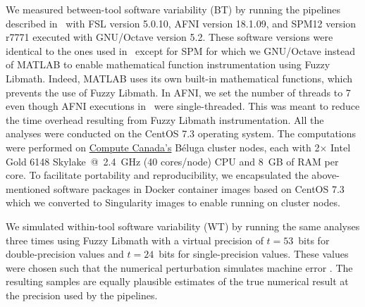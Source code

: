\documentclass[11pt,onecolumn]{article}
\begin{document}
We measured between-tool software variability (BT) by running the pipelines
described in~\cite{bowring2019exploring} with FSL version 5.0.10, AFNI
version 18.1.09, and SPM12 version r7771 executed with GNU/Octave version
5.2. These software versions were identical to the ones used 
in~\cite{bowring2019exploring} except for SPM for which we  GNU/Octave
instead of MATLAB to enable mathematical function instrumentation using
Fuzzy Libmath. Indeed, MATLAB uses its own built-in mathematical functions,
which prevents the use of Fuzzy Libmath. In AFNI, we set the number of
threads to 7 even though AFNI executions
in~\cite{bowring2019exploring} were single-threaded. This was meant to
reduce the time overhead resulting from Fuzzy Libmath instrumentation.
All the analyses were conducted on the CentOS 7.3 operating system. The
computations were performed on \href{https://www.computecanada.ca}{Compute
  Canada's} Béluga cluster nodes, each with 2$\times$ Intel Gold 6148 Skylake~@~2.4~GHz
(40 cores/node) CPU and 8~GB of RAM per core. To facilitate portability and reproducibility,
we encapsulated the
above-mentioned software packages in Docker container images based on CentOS 7.3
which we converted to Singularity images to enable running on cluster nodes.

We simulated within-tool software variability (WT) by running the same analyses three
times using Fuzzy Libmath with a virtual precision of $t=53$~bits for
double-precision values and $t=24$~bits for single-precision values. These
values were chosen such that the numerical perturbation simulates machine
error . The resulting samples are equally plausible estimates of
the true numerical result at the precision used by the pipelines. 
\end{document}
